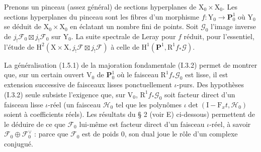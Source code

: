 \documentclass[11pt,leqno]{article}
\begin{document}
Prenons un pinceau (assez général) de sections hyperplanes de \(\mathrm{X}_0\times\mathrm{X}_0\). Les sections hyperplanes du pinceau sont les fibres d’un morphisme \(f:\mathrm{Y}_0\to\mathbf{P}_0^1\) où \(\mathrm{Y}_0\) se déduit de \(\mathrm{X}_0\times\mathrm{X}_0\) en éclatant un nombre fini de points. Soit \(\mathscr{G}_0\) l’image inverse de \(j_!\mathscr{F}_0\boxtimes j_!\mathscr{F}_0\) sur \(\mathrm{Y}_0\). La suite spectrale de Leray pour \(f\) réduit, pour l’essentiel, l’étude de \(\mathrm{H}^2(\mathrm{X}\times\mathrm{X},j_!\mathscr{F}\boxtimes j_!\mathscr{F})\) à celle de \(\mathrm{H}^1(\mathbf{P}^1,\mathrm{R}^1 f_*\mathscr{G})\).

La généralisation (1.5.1) de la majoration fondamentale (I.3.2) permet de montrer que, sur un certain ouvert \(\mathrm{V}_0\) de \(\mathbf{P}_0^1\) où le faisceau \(\mathrm{R}^1 f_*\mathscr{G}_0\) est lisse, il est extension successive de faisceaux lisses ponctuellement \(\iota\)-purs. Des hypothèses (I.3.2) seule subsiste l’exigence que, sur \(\mathrm{V}_0\), \(\mathrm{R}^1 f_*\mathscr{G}_0\) soit facteur direct d’un faisceau lisse \(\iota\)-réel (un faisceau \(\mathscr{H}_0\) tel que les polynômes \(\iota\det(\mathrm{I}-\mathrm{F}_x t,\mathscr{H}_0)\) soient à coefficients réels). Les résultats du § 2 (voir E) ci-dessous) permettent de le déduire de ce que \(\mathscr{F}_0\) lui-même est facteur direct d’un faisceau \(\iota\)-réel, à savoir \(\mathscr{F}_0\oplus\mathscr{F}_0^\vee\) : parce que \(\mathscr{F}_0\) est de poids 0, son dual joue le rôle d’un complexe conjugué.
\end{document}
